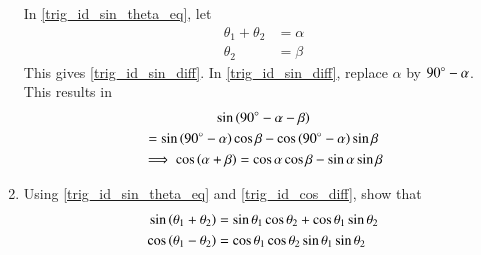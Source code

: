 \begin{enumerate}[label=\arabic*.,ref=\thesubsection.\theenumi]
\solution In \eqref{trig_id_sin_theta_eq}, let
%
\begin{equation}
\begin{split}
\theta_1 + \theta_2 &= \alpha \\
\theta_2 &=  \beta
\end{split}
\end{equation}
%
This gives \eqref{trig_id_sin_diff}.  In \eqref{trig_id_sin_diff}, replace $\alpha$ by 
%
$90{\degree} - \alpha$.  This results in
%
\begin{multline}
\sin\left(90{\degree} - \alpha - \beta\right)
\\
=
\sin \left(90{\degree} -\alpha\right) \cos \beta - \cos \left(90{\degree} -\alpha\right) \sin \beta \\
\implies \cos\left(\alpha + \beta\right) = \cos \alpha \cos \beta - \sin \alpha \sin \beta
\end{multline}
% 
\item
	Using \eqref{trig_id_sin_theta_eq} and \eqref{trig_id_cos_diff}, show that
\begin{align}
\label{trig_id_sin_sum}
\sin\left(\theta_1 + \theta_2\right) &= \sin\theta_1  \cos\theta_2 + \cos\theta_1\sin\theta_2
\\
\cos\left(\theta_1 - \theta_2\right) &= \cos\theta_1  \cos\theta_2  \sin\theta_1\sin\theta_2
\label{trig_id_cos_sum}
\end{align}


\end{enumerate}
